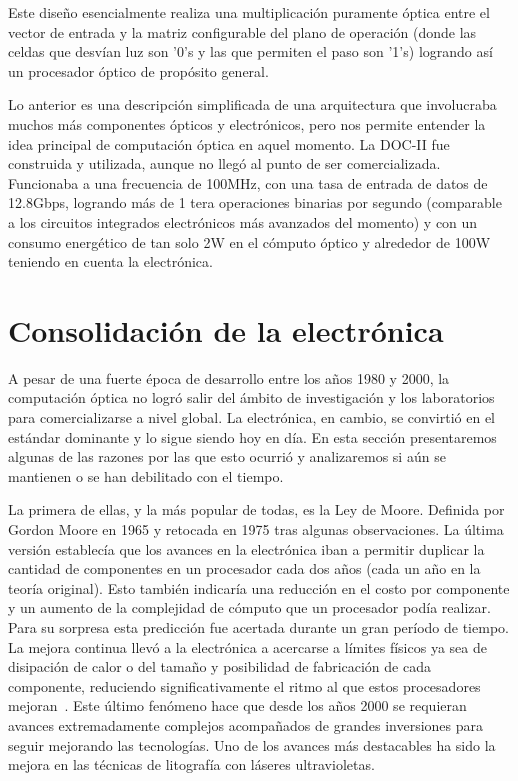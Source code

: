 \documentclass[12pt,a4paper]{report}
\begin{document}
Este diseño esencialmente realiza una multiplicación puramente óptica entre el vector de entrada y la matriz configurable del plano de operación (donde las celdas que desvían luz son '0's y las que permiten el paso son '1's) logrando así un procesador óptico de propósito general.

Lo anterior es una descripción simplificada de una arquitectura que involucraba muchos más componentes ópticos y electrónicos, pero nos permite entender la idea principal de computación óptica en aquel momento. La DOC-II fue construida y utilizada, aunque no llegó al punto de ser comercializada. Funcionaba a una frecuencia de 100MHz, con una tasa de entrada de datos de 12.8Gbps, logrando más de 1 tera operaciones binarias por segundo (comparable a los circuitos integrados electrónicos más avanzados del momento) y con un consumo energético de tan solo 2W en el cómputo óptico y alrededor de 100W teniendo en cuenta la electrónica.

\section{Consolidación de la electrónica}

A pesar de una fuerte época de desarrollo entre los años 1980 y 2000, la computación óptica no logró salir del ámbito de investigación y los laboratorios para comercializarse a nivel global. La electrónica, en cambio, se convirtió en el estándar dominante y lo sigue siendo hoy en día. En esta sección presentaremos algunas de las razones por las que esto ocurrió y analizaremos si aún se mantienen o se han debilitado con el tiempo.

La primera de ellas, y la más popular de todas, es la Ley de Moore. Definida por Gordon Moore en 1965 y retocada en 1975 tras algunas observaciones. La última versión establecía que los avances en la electrónica iban a permitir duplicar la cantidad de componentes en un procesador cada dos años (cada un año en la teoría original). Esto también indicaría una reducción en el costo por componente y un aumento de la complejidad de cómputo que un procesador podía realizar. Para su sorpresa esta predicción fue acertada durante un gran período de tiempo. La mejora continua llevó a la electrónica a acercarse a límites físicos ya sea de disipación de calor o del tamaño y posibilidad de fabricación de cada componente, reduciendo significativamente el ritmo al que estos procesadores mejoran~\cite{leyDeMoore}. Este último fenómeno hace que desde los años 2000 se requieran avances extremadamente complejos acompañados de grandes inversiones para seguir mejorando las tecnologías. Uno de los avances más destacables ha sido la mejora en las técnicas de litografía con láseres ultravioletas.
\end{document}
